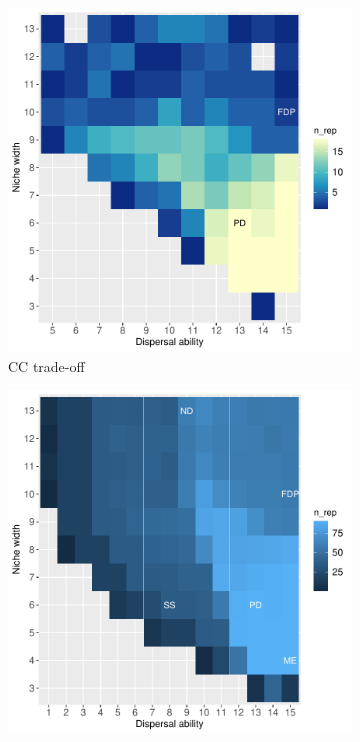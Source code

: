	\begin{figure}\ContinuedFloat
		\centering
		\begin{subfigure}[b]{0.45\linewidth}
			\includegraphics[width=\linewidth]{./figures/Parameter_space_overlook_CC_tradeoff.pdf}
			\caption{CC trade-off}
			\label{fig:para-CC}
		\end{subfigure}
		\begin{subfigure}[b]{0.45\linewidth}
			\includegraphics[width=\linewidth]{./figures/Parameter_space_overlook_archetypes.pdf}

\end{subfigure}
\end{figure}
